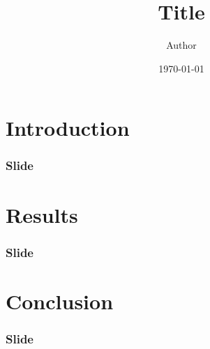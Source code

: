 \documentclass[nonav,background]{beamer}
\title{Title}
\date{\today}
\author{Author}
\begin{document}
\begin{frame}[plain]
\titlepage
\end{frame}

\section[Outline]{}
\begin{frame}
\tableofcontents[hideallsubsections]
\end{frame}

\section{Introduction}
\begin{frame} 
\frametitle{Slide} 
\end{frame}

\section{Results}
\begin{frame} 
\frametitle{Slide} 
\end{frame}


\section{Conclusion}
\begin{frame} 
\frametitle{Slide} 
\end{frame}
\end{document}
